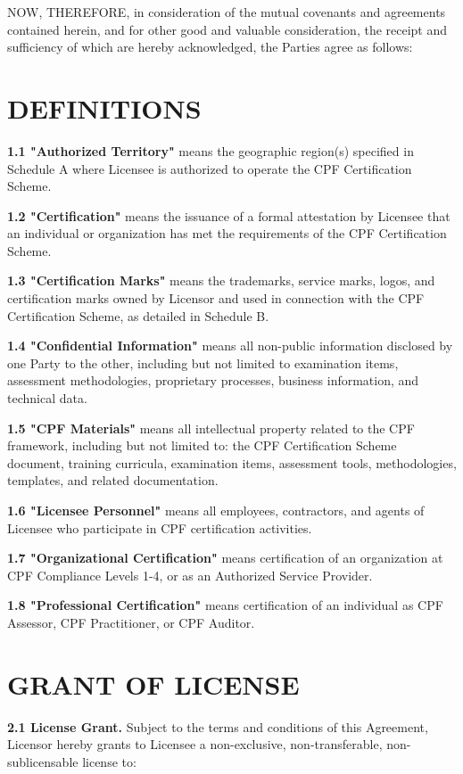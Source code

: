 \documentclass[11pt,a4paper]{article}
\begin{document}
NOW, THEREFORE, in consideration of the mutual covenants and agreements contained herein, and for other good and valuable consideration, the receipt and sufficiency of which are hereby acknowledged, the Parties agree as follows:

\section{DEFINITIONS}

\textbf{1.1 "Authorized Territory"} means the geographic region(s) specified in Schedule A where Licensee is authorized to operate the CPF Certification Scheme.

\textbf{1.2 "Certification"} means the issuance of a formal attestation by Licensee that an individual or organization has met the requirements of the CPF Certification Scheme.

\textbf{1.3 "Certification Marks"} means the trademarks, service marks, logos, and certification marks owned by Licensor and used in connection with the CPF Certification Scheme, as detailed in Schedule B.

\textbf{1.4 "Confidential Information"} means all non-public information disclosed by one Party to the other, including but not limited to examination items, assessment methodologies, proprietary processes, business information, and technical data.

\textbf{1.5 "CPF Materials"} means all intellectual property related to the CPF framework, including but not limited to: the CPF Certification Scheme document, training curricula, examination items, assessment tools, methodologies, templates, and related documentation.

\textbf{1.6 "Licensee Personnel"} means all employees, contractors, and agents of Licensee who participate in CPF certification activities.

\textbf{1.7 "Organizational Certification"} means certification of an organization at CPF Compliance Levels 1-4, or as an Authorized Service Provider.

\textbf{1.8 "Professional Certification"} means certification of an individual as CPF Assessor, CPF Practitioner, or CPF Auditor.

\section{GRANT OF LICENSE}

\textbf{2.1 License Grant.} Subject to the terms and conditions of this Agreement, Licensor hereby grants to Licensee a non-exclusive, non-transferable, non-sublicensable license to:
\end{document}
